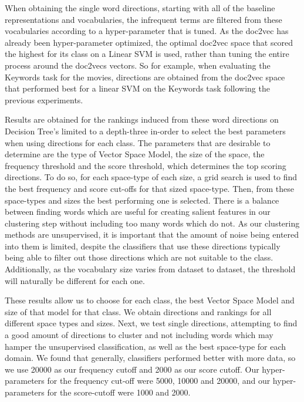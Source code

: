 When obtaining the single word directions, starting with all of the baseline representations and vocabularies, the infrequent terms are filtered from these vocabularies according to a hyper-parameter that is tuned. As the doc2vec has already been hyper-parameter optimized, the optimal doc2vec space that scored the highest for its class on a Linear SVM is used, rather than tuning the entire process around the doc2vecs vectors. So for example, when evaluating the Keywords task for the movies, directions are obtained from the doc2vec space that performed best for a linear SVM on the Keywords task following the previous experiments. 


Results are obtained for the rankings induced from these word directions on Decision Tree's limited to a depth-three in-order to select the best parameters when using directions for each class. The parameters that are desirable to determine are the type of Vector Space Model, the size of the space, the frequency threshold and the score threshold, which determines the top scoring directions. To do so, for each space-type of each size, a grid search is used to find the best frequency and score cut-offs for that sized space-type. Then, from these space-types and sizes the best performing one is selected. There is a balance between finding words which are useful for creating salient features in our clustering step without including too many words which do not. As our clustering methods are unsupervised, it is important that the amount of noise being entered into them is limited, despite the classifiers that use these directions typically being able to filter out those directions which are not suitable to the class. Additionally, as the vocabulary size varies from dataset to dataset, the threshold will naturally be different for each one. 

These results allow us to choose for each class, the best Vector Space Model and size of that model for that class. We obtain directions and rankings for all different space types and sizes.
Next, we test single directions, attempting to find a good amount of directions to cluster and not including words which may hamper the unsupervised classification, as well as the best space-type for each domain. We found that generally,  classifiers performed better with more data, so we use 20000 as our frequency cutoff and 2000 as our score cutoff. Our hyper-parameters for the frequency cut-off were 5000, 10000 and 20000, and our hyper-parameters for the score-cutoff were 1000 and 2000.

